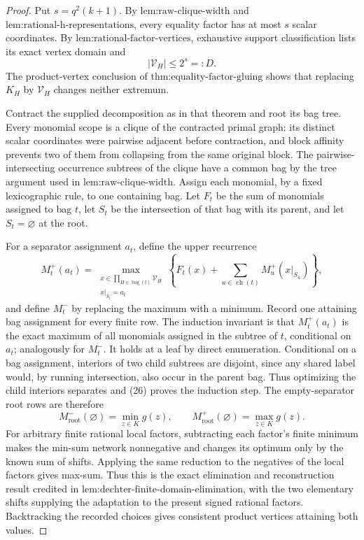 \documentclass{article}
\begin{document}
\begin{proof}
Put \(s=q^2(k+1)\).  By \(\text{lem:raw-clique-width}\) and \(\text{lem:rational-h-representations}\), every equality factor has at most \(s\) scalar coordinates.  By \(\text{lem:rational-factor-vertices}\), exhaustive support classification lists its exact vertex domain and
\[
|\mathcal V_H|\le 2^s=:D. \tag{25}
\]
The product-vertex conclusion of \(\text{thm:equality-factor-gluing}\) shows that replacing \(K_H\) by \(\mathcal V_H\) changes neither extremum.

Contract the supplied decomposition as in that theorem and root its bag tree.  Every monomial scope is a clique of the contracted primal graph: its distinct scalar coordinates were pairwise adjacent before contraction, and block affinity prevents two of them from collapsing from the same original block.  The pairwise-intersecting occurrence subtrees of the clique have a common bag by the tree argument used in \(\text{lem:raw-clique-width}\).  Assign each monomial, by a fixed lexicographic rule, to one containing bag.  Let \(F_t\) be the sum of monomials assigned to bag \(t\), let \(S_t\) be the intersection of that bag with its parent, and let \(S_t=\varnothing\) at the root.

For a separator assignment \(a_t\), define the upper recurrence
\[
M_t^+(a_t)=
\max_{\substack{x\in\prod_{H\in\operatorname{bag}(t)}\mathcal V_H\\x|_{S_t}=a_t}}
\left\{F_t(x)+\sum_{u\in\operatorname{ch}(t)}M_u^+(x|_{S_u})\right\}, \tag{26}
\]
and define \(M_t^-\) by replacing the maximum with a minimum.  Record one attaining bag assignment for every finite row.  The induction invariant is that \(M_t^+(a_t)\) is the exact maximum of all monomials assigned in the subtree of \(t\), conditional on \(a_t\); analogously for \(M_t^-\).  It holds at a leaf by direct enumeration.  Conditional on a bag assignment, interiors of two child subtrees are disjoint, since any shared label would, by running intersection, also occur in the parent bag.  Thus optimizing the child interiors separates and (26) proves the induction step.  The empty-separator root rows are therefore
\[
M_{\mathrm{root}}^-(\varnothing)=\min_{z\in K}g(z),
\qquad
M_{\mathrm{root}}^+(\varnothing)=\max_{z\in K}g(z). \tag{27}
\]
For arbitrary finite rational local factors, subtracting each factor's finite minimum makes the min-sum network nonnegative and changes its optimum only by the known sum of shifts.  Applying the same reduction to the negatives of the local factors gives max-sum.  Thus this is the exact elimination and reconstruction result credited in \(\text{lem:dechter-finite-domain-elimination}\), with the two elementary shifts supplying the adaptation to the present signed rational factors.  Backtracking the recorded choices gives consistent product vertices attaining both values.


\end{proof}
\end{document}
